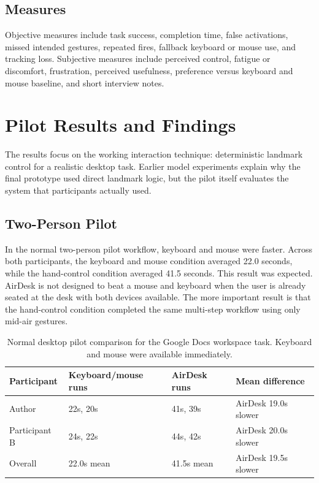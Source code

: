 \documentclass[manuscript]{acmart}
\begin{document}
\subsection{Measures}

Objective measures include task success, completion time, false activations, missed intended gestures, repeated fires, fallback keyboard or mouse use, and tracking loss. Subjective measures include perceived control, fatigue or discomfort, frustration, perceived usefulness, preference versus keyboard and mouse baseline, and short interview notes.

\section{Pilot Results and Findings}

The results focus on the working interaction technique: deterministic landmark control for a realistic desktop task. Earlier model experiments explain why the final prototype used direct landmark logic, but the pilot itself evaluates the system that participants actually used.

\subsection{Two-Person Pilot}

In the normal two-person pilot workflow, keyboard and mouse were faster. Across both participants, the keyboard and mouse condition averaged 22.0 seconds, while the hand-control condition averaged 41.5 seconds. This result was expected. AirDesk is not designed to beat a mouse and keyboard when the user is already seated at the desk with both devices available. The more important result is that the hand-control condition completed the same multi-step workflow using only mid-air gestures.

\begin{table}[h]
  \caption{Normal desktop pilot comparison for the Google Docs workspace task. Keyboard and mouse were available immediately.}
  \label{tab:pilot-results}
  \centering
  \begin{tabular}{llll}
    \hline
    Participant & Keyboard/mouse runs & AirDesk runs & Mean difference \\
    \hline
    Author & 22s, 20s & 41s, 39s & AirDesk 19.0s slower \\
    Participant B & 24s, 22s & 44s, 42s & AirDesk 20.0s slower \\
    Overall & 22.0s mean & 41.5s mean & AirDesk 19.5s slower \\
    \hline
  \end{tabular}
\end{table}
\end{document}

